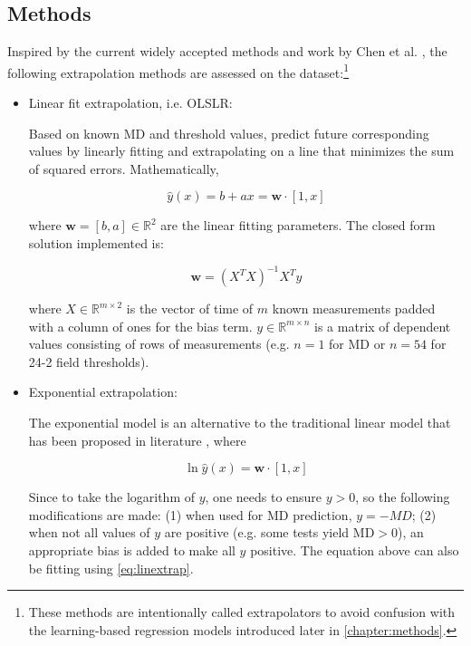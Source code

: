 \subsection{Methods} \label{naivemethods}

Inspired by the current widely accepted methods and work by Chen et al. \cite{Chen2014}, the following extrapolation methods are assessed on the dataset:\footnote{These methods are intentionally called extrapolators to avoid confusion with the learning-based regression models introduced later in \cref{chapter:methods}.}

\begin{itemize}
	\item Linear fit extrapolation, i.e. \acf{OLSLR}: 
	
	Based on known \ac{MD} and threshold values, predict future corresponding values by linearly fitting and extrapolating on a line that minimizes the sum of squared errors. Mathematically, 
	
	\begin{equation}
		\hat{y}(x)=b + ax=\mathbf{w}\cdot[1, x]
	\end{equation}
	
	where $\mathbf{w}=[b, a]\in \mathbb{R}^2$ are the linear fitting parameters. The closed form solution implemented is: 
	
	\begin{equation} \label{eq:linextrap}
		\mathbf{w}=(X^TX)^{-1}X^Ty
	\end{equation}
	
	where $X\in\mathbb{R}^{m\times 2}$ is the vector of time of $m$ known measurements padded with a column of ones for the bias term. $y\in\mathbb{R}^{m\times n}$ is a matrix of dependent values consisting of rows of measurements (e.g. $n=1$ for \ac{MD} or $n=54$ for 24-2 field thresholds).
	
	\item Exponential extrapolation: 
	
	The exponential model is an alternative to the traditional linear model that has been proposed in literature \cite{Chen2014,Pathak2013}, where 
	
	\begin{equation}
		\ln \hat{y}(x)=\mathbf{w}\cdot[1, x]
	\end{equation}
	
	Since to take the logarithm of $y$, one needs to ensure $y>0$, so the following modifications are made: (1) when used for \ac{MD} prediction, $y=-\textit{MD}$; (2) when not all values of $y$ are positive (e.g. some tests yield \ac{MD}$>0$), an appropriate bias is added to make all $y$ positive. The equation above can also be fitting using \cref{eq:linextrap}.
	

\end{itemize}
